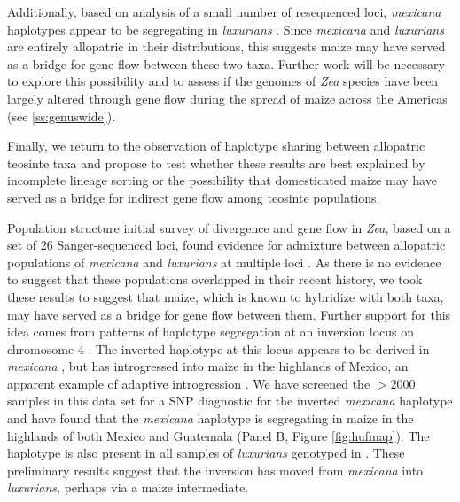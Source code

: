 Additionally, based on analysis of a small number of resequenced loci, \emph{mexicana} haplotypes appear to be segregating in \emph{luxurians} \citep{Ross-Ibarra2009a}.  
Since \emph{mexicana} and \emph{luxurians} are entirely allopatric in their distributions, this suggests maize may have served as a bridge for gene flow between these two taxa.  
Further work will be necessary to explore this possibility and to assess if the genomes of \emph{Zea} species have been largely altered through gene flow during the spread of maize across the Americas (see \ref{ss:genuswide}).

Finally, we return to the observation of haplotype sharing between allopatric teosinte taxa \citep{Ross-Ibarra2009a} and propose to test whether these results are best explained by incomplete lineage sorting or the possibility that domesticated maize may have served as a bridge for indirect gene flow among teosinte populations. 

Population structure  initial survey of divergence and gene flow in \emph{Zea}, based on a set of 26 Sanger-sequenced loci, found evidence for admixture between allopatric populations of \emph{mexicana} and \emph{luxurians} at multiple loci \citep{Ross-Ibarra2009a}. 
As there is no evidence to suggest that these populations overlapped in their recent history, we took these results to suggest that maize, which is known to hybridize with both taxa, may have served as a bridge for gene flow between them.
Further support for this idea comes from patterns of haplotype segregation at an inversion locus on chromosome 4 \citep[\emph{Inv4m};][]{Fang2012,Pyhajarvi2013,Hufford2013}. 
The inverted haplotype at this locus appears to be derived in \emph{mexicana} \citep{Pyhajarvi2013}, but has introgressed into maize in the highlands of Mexico, an apparent example of adaptive introgression \citep[Panel A, Figure \ref{fig:hufmap};][]{Hufford2013}.
We have screened the $>2000$ samples in this data set for a SNP diagnostic for the inverted \emph{mexicana} haplotype and have found that the \emph{mexicana} haplotype is segregating in maize in the highlands of both Mexico and Guatemala (Panel B, Figure \ref{fig:hufmap}).  The haplotype is also present in all samples of \emph{luxurians} genotyped in \citet{Fang2012}.
These preliminary results suggest that the inversion has moved from \emph{mexicana} into \emph{luxurians}, perhaps via a maize intermediate.

